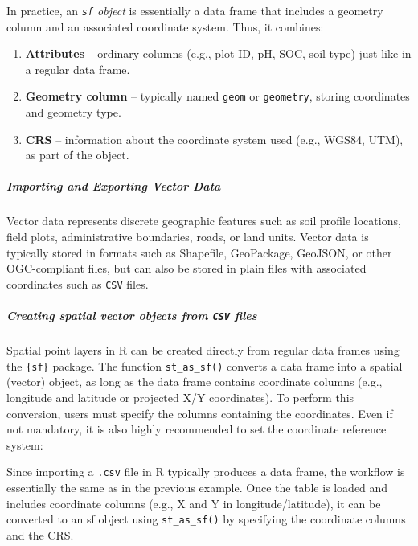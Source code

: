 \documentclass[
  10pt,
  b5paper,
  oneside]{book}
\providecommand{\tightlist}{%
  \setlength{\itemsep}{0pt}\setlength{\parskip}{0pt}}
\begin{document}
In practice, an \emph{\texttt{sf} object} is essentially a data frame that includes a geometry column and an associated coordinate system. Thus, it combines:\\

\begin{enumerate}
\def\labelenumi{\arabic{enumi}.}
\tightlist
\item
  \textbf{Attributes} -- ordinary columns (e.g., plot ID, pH, SOC, soil type) just like in a regular data frame.\\
\item
  \textbf{Geometry column} -- typically named \texttt{geom} or \texttt{geometry}, storing coordinates and geometry type.\\
\item
  \textbf{CRS} -- information about the coordinate system used (e.g., WGS84, UTM), as part of the object.\\
\end{enumerate}

\subparagraph*{Importing and Exporting Vector Data}\label{importing-and-exporting-vector-data}

Vector data represents discrete geographic features such as soil profile locations, field plots, administrative boundaries, roads, or land units.
Vector data is typically stored in formats such as Shapefile, GeoPackage, GeoJSON, or other OGC-compliant files, but can also be stored in plain files with associated coordinates such as \texttt{CSV} files.

\subparagraph*{\texorpdfstring{Creating spatial vector objects from \texttt{CSV} files}{Creating spatial vector objects from CSV files}}\label{creating-spatial-vector-objects-from-csv-files}

Spatial point layers in R can be created directly from regular data frames using the \texttt{\{sf\}} package.
The function \texttt{st\_as\_sf()} converts a data frame into a spatial (vector) object, as long as the data frame contains coordinate columns (e.g., longitude and latitude or projected X/Y coordinates).
To perform this conversion, users must specify the columns containing the coordinates. Even if not mandatory, it is also highly recommended to set the coordinate reference system:

Since importing a \texttt{.csv} file in R typically produces a data frame, the workflow is essentially the same as in the previous example. Once the table is loaded and includes coordinate columns (e.g., X and Y in longitude/latitude), it can be converted to an sf object using \texttt{st\_as\_sf()} by specifying the coordinate columns and the CRS.
\end{document}
